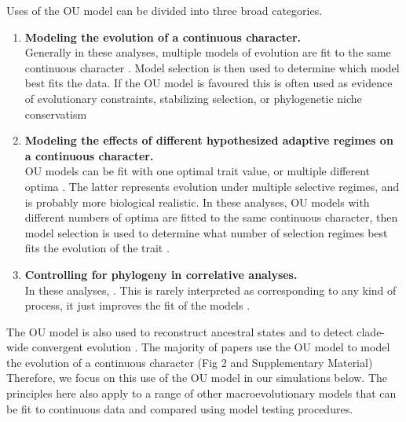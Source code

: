 \documentclass[a4paper,12pt]{article}
\begin{document}
  Uses of the OU model can be divided into three broad categories. %
    \begin{enumerate}
      \item \textbf{Modeling the evolution of a continuous character.}\\ 
            Generally in these analyses, multiple models of evolution are fit to the same continuous character \citep[e.g.,][]{Harmon:2010aa}. Model selection is then used to determine which model best fits the data. 
            If the OU model is favoured this is often used as evidence of evolutionary constraints, stabilizing selection, or phylogenetic niche conservatism \citep[e.g.,][]{Harmon:2010aa,cooper2010body,Wiens:2010aa,christin2013anatomical}
      \item \textbf{Modeling the effects of different hypothesized adaptive regimes on a continuous character.}\\
            OU models can be fit with one optimal trait value, or multiple different optima \citep{Butler:2004aa}. 
            The latter represents evolution under multiple selective regimes, and is probably more biological realistic. 
            In these analyses, OU models with different numbers of optima are fitted to the same continuous character, then model selection is used to determine what number of selection regimes best fits the evolution of the trait \citep[e.g.,][]{beaulieu2012ouwie}.
      \item \textbf{Controlling for phylogeny in correlative analyses.}\\ 
            In these analyses, . This is rarely interpreted as corresponding to any kind of process, it just improves the fit of the models \citep[e.g.,][]{}.%
    \end{enumerate}

  \noindent
  The OU model is also used to reconstruct ancestral states %
  and to detect clade-wide convergent evolution \citep{ingram2013surface}. 
  The majority of papers use the OU model to model the evolution of a continuous character (Fig 2 and Supplementary Material) %
  Therefore, we focus on this use of the OU model in our simulations below. The principles here also apply to a range of other macroevolutionary models that can be fit to continuous data and compared using model testing procedures.
\end{document}
